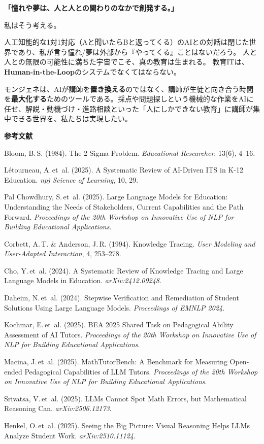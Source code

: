 \documentclass[paper=a4,fontsize=10.5bp,jafontsize=10.5bp,twocolumn]{jlreq}
\begin{document}
\begin{highlightbox}
\textbf{「憧れや夢は、人と人との関わりのなかで創発する。」}

私はそう考える。

人工知能的な1対1対応（Aと聞いたらBと返ってくる）のAIとの対話は閉じた世界であり、私が言う憧れ/夢は外部から『やってくる』ことはないだろう。
人と人との無限の可能性に満ちた宇宙でこそ、真の教育は生まれる。
教育ITは、\textbf{Human-in-the-Loop}のシステムでなくてはならない。
\end{highlightbox}

モンジェネは、AIが講師を\textbf{置き換える}のではなく、講師が生徒と向き合う時間を\textbf{最大化する}ためのツールである。採点や問題探しという機械的な作業をAIに任せ、解説・動機づけ・進路相談といった「人にしかできない教育」に講師が集中できる世界を、私たちは実現したい。

\vspace{1em}
\begin{small}
\noindent\textbf{参考文献}
\begin{enumerate}[leftmargin=2em,label={[\arabic*]}]
  \item Bloom, B.\,S. (1984). The 2 Sigma Problem. \textit{Educational Researcher}, 13(6), 4--16.
  \item L\'{e}tourneau, A.\,et~al. (2025). A Systematic Review of AI-Driven ITS in K-12 Education. \textit{npj Science of Learning}, 10, 29.
  \item Pal Chowdhury, S.\,et~al. (2025). Large Language Models for Education: Understanding the Needs of Stakeholders, Current Capabilities and the Path Forward. \textit{Proceedings of the 20th Workshop on Innovative Use of NLP for Building Educational Applications}.
  \item Corbett, A.\,T. \& Anderson, J.\,R. (1994). Knowledge Tracing. \textit{User Modeling and User-Adapted Interaction}, 4, 253--278.
  \item Cho, Y.\,et~al. (2024). A Systematic Review of Knowledge Tracing and Large Language Models in Education. \textit{arXiv:2412.09248}.
  \item Daheim, N.\,et~al. (2024). Stepwise Verification and Remediation of Student Solutions Using Large Language Models. \textit{Proceedings of EMNLP 2024}.
  \item Kochmar, E.\,et~al. (2025). BEA 2025 Shared Task on Pedagogical Ability Assessment of AI Tutors. \textit{Proceedings of the 20th Workshop on Innovative Use of NLP for Building Educational Applications}.
  \item Macina, J.\,et~al. (2025). MathTutorBench: A Benchmark for Measuring Open-ended Pedagogical Capabilities of LLM Tutors. \textit{Proceedings of the 20th Workshop on Innovative Use of NLP for Building Educational Applications}.
  \item Srivatsa, V.\,et~al. (2025). LLMs Cannot Spot Math Errors, but Mathematical Reasoning Can. \textit{arXiv:2506.12173}.
  \item Henkel, O.\,et~al. (2025). Seeing the Big Picture: Visual Reasoning Helps LLMs Analyze Student Work. \textit{arXiv:2510.11124}.
\end{enumerate}
\end{small}
\end{document}
